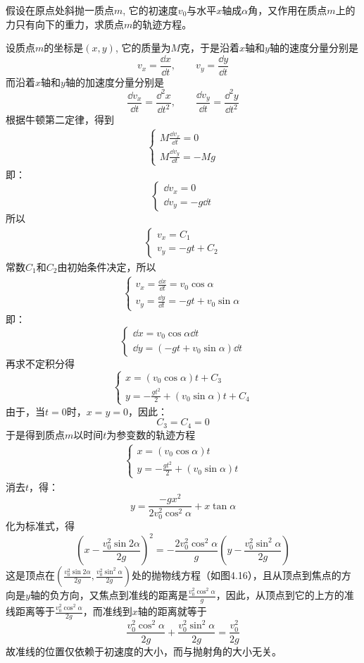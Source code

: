 \begin{example}
假设在原点处斜抛一质点$m$, 它的初速度$v_0$与水平$x$轴成$\alpha$角，又作用在质点$m$上的力只有向下的重力，求质点$m$的轨迹方程。
\end{example}

\begin{solution}
    设质点$m$的坐标是$(x,y)$, 它的质量为$M$克，于是沿着$x$轴和$y$轴的速度分量分别是
    \[v_x=\frac{\dd x}{\dd t},\qquad v_y=\frac{\dd y}{\dd t}\]
    而沿着$x$轴和$y$轴的加速度分量分别是
    \[\frac{\dd v_x}{\dd t}=\frac{\dd^2 x}{\dd t^2},\qquad \frac{\dd v_y}{\dd t}=\frac{\dd^2 y}{\dd t^2}\]
    根据牛顿第二定律，得到
\begin{align}
\begin{cases}
        M\frac{\dd v_x}{\dd t}=0\\
    M\frac{\dd v_y}{\dd t}=-Mg
\end{cases}
\end{align}
即：
\[\begin{cases}
    \dd v_x=0\\ \dd v_y=-g\dd t
\end{cases}\]
所以
\begin{align}
\begin{cases}
    v_x=C_1\\ v_y=-gt+C_2
\end{cases}
\end{align}
常数$C_1$和$C_2$由初始条件决定，所以
\begin{align}
\begin{cases}
v_x=\frac{\dd x}{\dd t}=v_0\cos\alpha\\
v_y=\frac{\dd y}{\dd t}=-gt+v_0\sin\alpha
\end{cases}
\end{align}
即：    
\[\begin{cases}
    \dd x=v_0\cos\alpha \dd t\\ \dd y=(-g t+v_0\sin\alpha)\dd t
\end{cases}\]
再求不定积分得
\[\begin{cases}
    x=(v_0\cos\alpha)t+C_3\\
    y=-\frac{gt^2}{2}+(v_0\sin\alpha)t+C_4
\end{cases}\]
由于，当$t=0$时，$x=y=0$，因此：
\[C_3=C_4=0\]
于是得到质点$m$以时间$t$为参变数的轨迹方程
\begin{align}
\begin{cases}
    x=(v_0\cos\alpha)t\\
    y=-\frac{gt^2}{2}+(v_0\sin\alpha)t
\end{cases}
\end{align}
消去$t$，得：
\[y=\frac{-gx^2}{2v^2_0 \cos^2\alpha}+x\tan\alpha\]
化为标准式，得
\[\left(x-\frac{v^2_0\sin2\alpha}{2g}\right)^2=-\frac{2v^2_0\cos^2\alpha}{g}\left(y-\frac{v^2_0\sin^2\alpha}{2g}\right)\]
这是顶点在$\left(\frac{v^2_0\sin2\alpha}{2g},\frac{v^2_0\sin^2\alpha}{2g}\right)$处的抛物线方程（如图4.16），且从顶点到焦点的方向是$y$轴的负方向，又焦点到准线的距离是$\frac{v^2_0 \cos^2\alpha}{g}$，因此，从顶点到它的上方的准线距离等于$\frac{v^2_0 \cos^2\alpha}{2g}$，而准线到$x$轴的距离就等于
\[\frac{v^2_0 \cos^2\alpha}{2g}+\frac{v^2_0 \sin^2\alpha}{2g}=\frac{v^2_0}{2g}\]
故准线的位置仅依赖于初速度的大小，而与抛射角的大小无关。


\end{solution}
